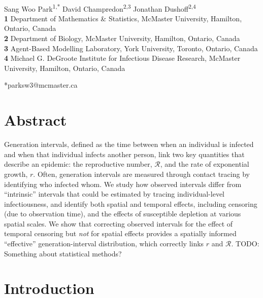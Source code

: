 \documentclass[12pt]{article}
\date{\today}
\newcommand{\RR}{\ensuremath{{\mathcal R}}}
\begin{document}
\begin{flushleft}{
	\Large
	\textbf{}
}
\newline
\\
Sang Woo Park\textsuperscript{1,*}
David Champredon\textsuperscript{2,3}
Jonathan Dushoff\textsuperscript{2,4}
\\

\bigskip
\textbf{1} Department of Mathematics \& Statistics, McMaster University, Hamilton, Ontario, Canada
\\
\textbf{2} Department of Biology, McMaster University, Hamilton, Ontario, Canada
\\
\textbf{3} Agent-Based Modelling Laboratory, York University, Toronto, Ontario, Canada
\\
\textbf{4} Michael G. DeGroote Institute for Infectious Disease Research, McMaster University, Hamilton, Ontario, Canada
\\
\bigskip

*parksw3@mcmaster.ca
\end{flushleft} 

\section*{Abstract}

Generation intervals, defined as the time between when an individual is infected and when that individual infects another person, link two key quantities that describe an epidemic: the reproductive number, $\RR$, and the rate of exponential growth, $r$.
Often, generation intervals are measured through contact tracing by identifying who infected whom.
We study how observed intervals differ from ``intrinsic'' intervals that could be estimated by tracing individual-level infectiousness, and identify both spatial and temporal effects, including censoring (due to observation time), and the effects of susceptible depletion at various spatial scales. 
We show that correcting observed intervals for the effect of temporal censoring but \emph{not} for spatial effects provides a spatially informed ``effective'' generation-interval distribution, which correctly links $r$ and $\RR$.
TODO: Something about statistical methods?

\section{Introduction}
\end{document}
